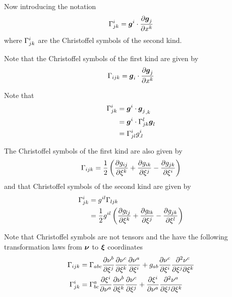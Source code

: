 Now introducing the notation
\begin{equation}
   \Gamma^{i}_{jk}  =   \boldsymbol{g} ^{i}  \cdot   \dfrac{\partial  \boldsymbol{g} _{j}}{\partial x^{k}}  
\end{equation}
where $ \Gamma^{i}_{jk} $ are the Christoffel symbols of the second
kind. 

Note that the Christoffel symbols of the first kind are given by
\begin{equation}
   \Gamma_{ijk}  =   \boldsymbol{g} _{i}  \cdot   \dfrac{\partial  \boldsymbol{g} _{j}}{\partial x^{k}}  
\end{equation}

Note that
\begin{equation}
  \begin{split}
     \Gamma^{i}_{jk}  &=   \boldsymbol{g} ^{i}  \cdot   {\ensuremath{ \boldsymbol{g} }_{j}}_{,k}   \\
    &=  \boldsymbol{g} ^{i}  \cdot   \Gamma^{l}_{jk}  \boldsymbol{g} _{l}  \\
    &=  \Gamma^{i}_{jl} g^{i}_{.l} 
  \end{split}
\end{equation}

The Christoffel symbols of the first kind are also given by
\begin{equation}
   \Gamma_{ijk} =\frac{1}{2}\left(  \dfrac{\partial g_{ij}}{\partial \xi^{k}} + \dfrac{\partial g_{ik}}{\partial \xi^{j}} - \dfrac{\partial g_{jk}}{\partial \xi^{i}}  \right)
\end{equation}
and that Christoffel symbols of the second kind are given by
\begin{equation}
  \begin{split}
     \Gamma^{i}_{jk}  &= g^{il} \Gamma_{ljk}  \\
    &= \frac{1}{2}g^{il}\left(  \dfrac{\partial g_{lj}}{\partial \xi^{k}} + \dfrac{\partial g_{lk}}{\partial \xi^{j}} - \dfrac{\partial g_{jk}}{\partial \xi^{l}}  \right) 
  \end{split}
\end{equation}

Note that Christoffel symbols are not tensors and the have the following
transformation laws from $ \boldsymbol{\nu} $ to $ \boldsymbol{\xi} $ coordinates
\begin{align}
   \Gamma_{ijk}  &=
   \Gamma_{abc}  \dfrac{\partial \nu^{b}}{\partial \xi^{j}}  \dfrac{\partial \nu^{c}}{\partial \xi^{k}}  \dfrac{\partial \nu^{a}}{\partial \xi^{i}} +
  g_{ab} \dfrac{\partial \nu^{c}}{\partial \xi^{i}}  \dfrac{\partial^{2} \nu^{c}}{\partial \xi^{j} \partial \xi^{k}}  \\
   \Gamma^{i}_{jk}  &=  \Gamma^{a}_{bc}  \dfrac{\partial \xi^{i}}{\partial \nu^{a}}  \dfrac{\partial \nu^{b}}{\partial \xi^{k}}  \dfrac{\partial \nu^{c}}{\partial \xi^{j}} +
   \dfrac{\partial \xi^{i}}{\partial \nu^{a}}  \dfrac{\partial^{2} \nu^{a}}{\partial \xi^{j} \partial \xi^{k}}  \\
\end{align}

